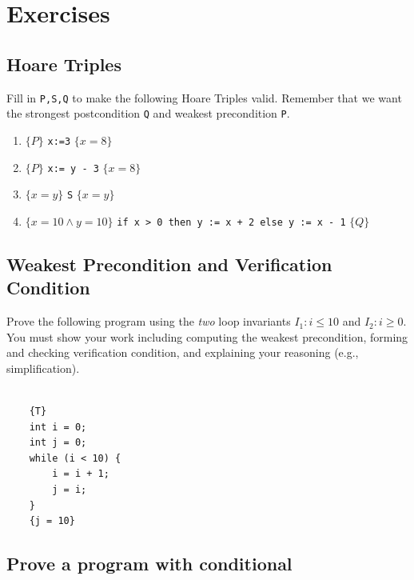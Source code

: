 \documentclass[oneside,11pt,dvipsnames]{book}
\newcommand{\code}[1]{\texttt{#1}}
\begin{document}
\section{Exercises}

\subsection{Hoare Triples}\label{exercise:hoare-tripples}

Fill in \texttt{P,S,Q} to make the following Hoare Triples valid. Remember that we want the strongest postcondition \code{Q} and weakest precondition \code{P}.

\begin{enumerate}
\item
  $\{P\}$ \code{x:=3} $\{x = 8\}$
\item
  $\{P\}$ \code{x:= y - 3} $\{x = 8\}$
\item
  $\{x = y\}$ \code{S} $\{x = y\}$
\item $\{ x=10 \land y = 10\}$ \code{if x > 0 then y := x + 2 else y := x - 1} $\{ Q\}$
\end{enumerate}


\subsection{Weakest Precondition and Verification Condition}\label{exercise:wp-vc}

Prove the following program using the \emph{two} loop invariants $I_1: i \le 10$ and $I_2: i \ge 0$.  You must show your work including computing the weakest precondition, forming and checking verification condition, and explaining your reasoning (e.g., simplification). 

\begin{lstlisting}

    {T}
    int i = 0;
    int j = 0;
    while (i < 10) {
        i = i + 1;
        j = i;
    }
    {j = 10}

\end{lstlisting}    


\subsection{Prove a program with conditional}\label{exercise:conditional}
\end{document}

